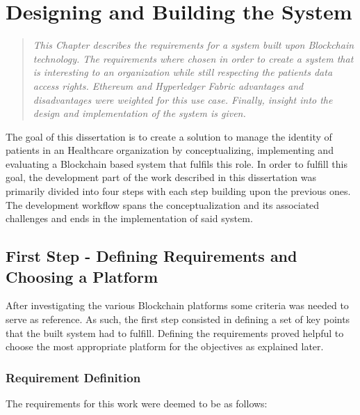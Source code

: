 \chapter{Designing and Building the System} \label{development}

\begin{quote}
\emph{This Chapter describes the requirements for a system built upon
  Blockchain technology. The requirements where chosen in order to create a
  system that is interesting to an organization while still respecting the
  patients data access rights. Ethereum and Hyperledger Fabric advantages and
disadvantages were weighted for this use case. Finally, insight into the design
and implementation of the system is given.} \end{quote}

The goal of this dissertation is to create a solution to manage the identity of
patients in an Healthcare organization by conceptualizing, implementing and
evaluating a Blockchain based system that fulfils this role. In order to
fulfill this goal, the development part of the work described in this
dissertation was primarily divided into four steps with each step building upon
the previous ones. The development workflow spans the conceptualization and its
associated challenges and ends in the implementation of said system.

\section{First Step - Defining Requirements and Choosing a Platform}
\label{choosingHyperledger}

After investigating the various Blockchain platforms some criteria was needed
to serve as reference. As such, the first step consisted in defining a set of
key points that the built system had to fulfill. Defining the requirements
proved helpful to choose the most appropriate platform for the objectives as
explained later.

\subsection{Requirement Definition} 
The requirements for this work were deemed to be as follows:


